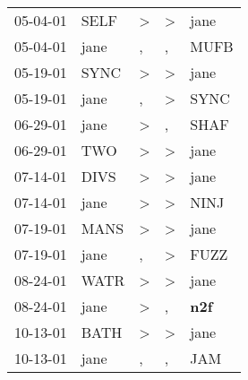 \begin{supertabular}{p{0.07\textwidth}p{0.06\textwidth}p{0.02\textwidth}p{0.02\textwidth}p{0.06\textwidth}}
          05-04-01\textsuperscript{} &           SELF\textsuperscript{} &     \textgreater &     \textgreater &           jane\textsuperscript{} \\
          05-04-01\textsuperscript{} &           jane\textsuperscript{} &                , &                , &           MUFB\textsuperscript{} \\
          05-19-01\textsuperscript{} &           SYNC\textsuperscript{} &     \textgreater &     \textgreater &           jane\textsuperscript{} \\
          05-19-01\textsuperscript{} &           jane\textsuperscript{} &                , &     \textgreater &           SYNC\textsuperscript{} \\
          06-29-01\textsuperscript{} &           jane\textsuperscript{} &     \textgreater &                , &           SHAF\textsuperscript{} \\
          06-29-01\textsuperscript{} &            TWO\textsuperscript{} &     \textgreater &     \textgreater &           jane\textsuperscript{} \\
          07-14-01\textsuperscript{} &           DIVS\textsuperscript{} &     \textgreater &     \textgreater &           jane\textsuperscript{} \\
          07-14-01\textsuperscript{} &           jane\textsuperscript{} &     \textgreater &     \textgreater &           NINJ\textsuperscript{} \\
          07-19-01\textsuperscript{} &           MANS\textsuperscript{} &     \textgreater &     \textgreater &           jane\textsuperscript{} \\
          07-19-01\textsuperscript{} &           jane\textsuperscript{} &                , &     \textgreater &           FUZZ\textsuperscript{} \\
          08-24-01\textsuperscript{} &           WATR\textsuperscript{} &     \textgreater &     \textgreater &           jane\textsuperscript{} \\
          08-24-01\textsuperscript{} &           jane\textsuperscript{} &     \textgreater &                , &   \textbf{n2f\textsuperscript{}} \\
          10-13-01\textsuperscript{} &           BATH\textsuperscript{} &     \textgreater &     \textgreater &           jane\textsuperscript{} \\
          10-13-01\textsuperscript{} &           jane\textsuperscript{} &                , &                , &            JAM\textsuperscript{} \\

\end{supertabular}

